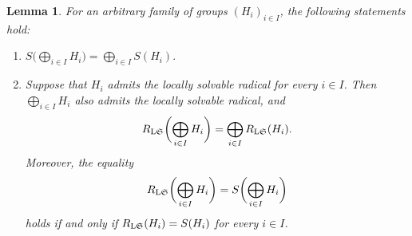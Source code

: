 \documentclass[11pt, reqno]{amsart}
\numberwithin{equation}{section}
\newtheorem{lemma}[theorem]{Lemma}
\theoremstyle{definition}
\numberwithin{equation}{section}
\begin{document}
\begin{lemma}\label{prop:famlocsolrad}
For an arbitrary family of groups $(H_i)_{i\in I}$, the following statements hold:
    \begin{enumerate}[label = \textup{(\arabic*)}]
         \item  $S\bigl(\bigoplus_{i \in I}H_i\bigr)=\bigoplus_{i \in I}S(H_i).$         \item Suppose that $H_i$ admits the locally solvable radical for every $i \in I$. Then $\bigoplus_{i \in I}H_i$ also admits the locally solvable radical, and
        $$ R_{\textup{L}\mathfrak{S}}\biggl(\bigoplus_{i \in I}H_i\biggr) = \bigoplus_{i\in I} R_{\textup{L}\mathfrak{S}}(H_i). $$
        Moreover, the equality $$R_{\textup{L}\mathfrak{S}} \biggl(\bigoplus_{i \in I}H_i \biggr) = S\biggl(\bigoplus_{i \in I}H_i \biggr)$$ holds if and only if $R_{\textup{L}\mathfrak{S}}(H_i) = S(H_i)$ for every $i \in I$.
    \end{enumerate}
\end{lemma}
    
\end{document}
